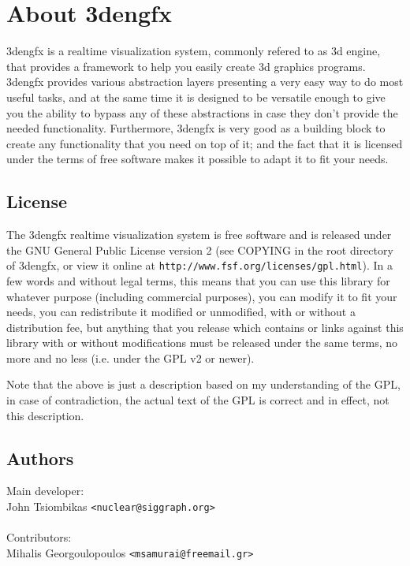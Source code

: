 \chapter{About 3dengfx}

3dengfx is a realtime visualization system, commonly refered to as 3d engine,
that provides a framework to help you easily create 3d graphics programs.
3dengfx provides various abstraction layers presenting a very easy way to do most
useful tasks, and at the same time it is designed to be versatile enough to give
you the ability to bypass any of these abstractions in case they don't provide
the needed functionality. Furthermore, 3dengfx is very good as a building block
to create any functionality that you need on top of it; and the fact that it is
licensed under the terms of free software makes it possible to adapt it to fit
your needs.

\section{License}
The 3dengfx realtime visualization system is free software and is released under
the GNU General Public License version 2 (see COPYING in the root directory of
3dengfx, or view it online at \verb|http://www.fsf.org/licenses/gpl.html|).
In a few words and without legal terms, this means that you can use this library
for whatever purpose (including commercial purposes), you can modify it to fit
your needs, you can redistribute it modified or unmodified, with or without a
distribution fee, but anything that you release which contains or links against
this library with or without modifications must be released under the same
terms, no more and no less (i.e. under the GPL v2 or newer).

Note that the above is just a description based on my understanding of the GPL,
in case of contradiction, the actual text of the GPL is correct and in effect,
not this description.

\section{Authors}

Main developer:\\
John Tsiombikas \verb|<nuclear@siggraph.org>|\\
\\
Contributors:\\
Mihalis Georgoulopoulos \verb|<msamurai@freemail.gr>|

